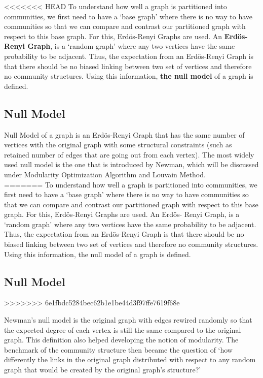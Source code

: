 \documentclass[10pt]{article}
\begin{document}
<<<<<<< HEAD
To understand how well a graph is partitioned into communities, we first need to have a ‘base graph’ where there is no way to have communities so that we can compare and contrast our partitioned graph with respect to this base graph. For this, Erdös-Renyi Graphs are used. An \textbf{Erdös-Renyi Graph}, is a ‘random graph’ where any two vertices have the same probability to be adjacent\cite{erdos}. Thus, the expectation from an Erdös-Renyi Graph is that there should be no biased linking between two set of vertices and therefore no community structures. Using this information, \textbf{the null model} of a graph is defined. \\

\subsection{Null Model}

Null Model of a graph is an Erdös-Renyi Graph that has the same number of vertices with the original graph with some structural constraints (such as retained number of edges that are going out from each vertex). The most widely used null model is the one that is introduced by Newman, which will be discussed under Modularity Optimization Algorithm and Louvain Method. \\
=======
To understand how well a graph is partitioned into communities, we first need to have a ‘base graph’ where there is no way to have communities so that we can compare and contrast our partitioned graph with respect to this base graph. For this, Erdös-Renyi Graphs are used. An Erdös- Renyi Graph, is a ‘random graph’ where any two vertices have the same probability to be adjacent\cite{erdos}. Thus, the expectation from an Erdös-Renyi Graph is that there should be no biased linking between two set of vertices and therefore no community structures. Using this information, the null model of a graph is defined. \\

\subsection{Null Model}
>>>>>>> 6e1fbdc5284bec62b1e1be44d3f97ffe7619f68e

Newman’s null model is the original graph with edges rewired randomly so that the expected degree of each vertex is still the same compared to the original graph. This definition also helped developing the notion of modularity. The benchmark of the community structure then became the question of ‘how differently the links in the original graph distributed with respect to any random graph that would be created by the original graph’s structure?’ \\
\end{document}
